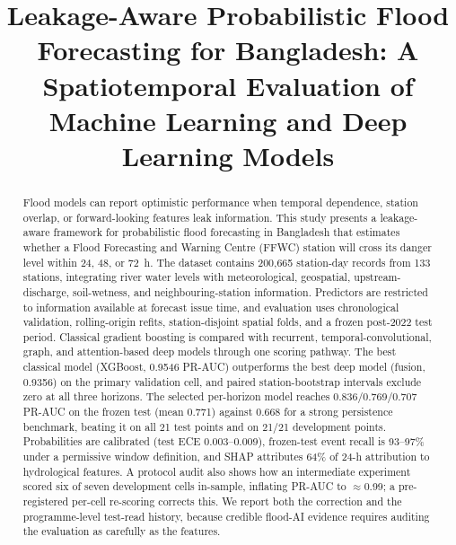 \documentclass[conference]{IEEEtran}
\begin{document}
\title{Leakage-Aware Probabilistic Flood Forecasting for Bangladesh: A Spatiotemporal Evaluation of Machine Learning and Deep Learning Models}

\author{
}

\maketitle

\begin{abstract}
Flood models can report optimistic performance when temporal dependence, station overlap, or forward-looking features leak information. This study presents a leakage-aware framework for probabilistic flood forecasting in Bangladesh that estimates whether a Flood Forecasting and Warning Centre (FFWC) station will cross its danger level within 24, 48, or 72~h. The dataset contains 200{,}665 station-day records from 133 stations, integrating river water levels with meteorological, geospatial, upstream-discharge, soil-wetness, and neighbouring-station information. Predictors are restricted to information available at forecast issue time, and evaluation uses chronological validation, rolling-origin refits, station-disjoint spatial folds, and a frozen post-2022 test period. Classical gradient boosting is compared with recurrent, temporal-convolutional, graph, and attention-based deep models through one scoring pathway. The best classical model (XGBoost, 0.9546 PR-AUC) outperforms the best deep model (fusion, 0.9356) on the primary validation cell, and paired station-bootstrap intervals exclude zero at all three horizons. The selected per-horizon model reaches 0.836/0.769/0.707 PR-AUC on the frozen test (mean 0.771) against 0.668 for a strong persistence benchmark, beating it on all 21 test points and on 21/21 development points. Probabilities are calibrated (test ECE 0.003--0.009), frozen-test event recall is 93--97\% under a permissive window definition, and SHAP attributes 64\% of 24-h attribution to hydrological features. A protocol audit also shows how an intermediate experiment scored six of seven development cells in-sample, inflating PR-AUC to $\approx$0.99; a pre-registered per-cell re-scoring corrects this. We report both the correction and the programme-level test-read history, because credible flood-AI evidence requires auditing the evaluation as carefully as the features.
\end{abstract}
\end{document}
